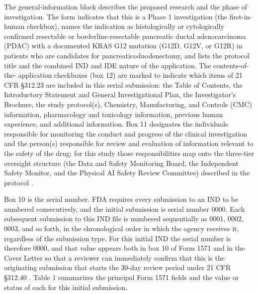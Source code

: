 The general-information block describes the proposed research and the
phase of investigation. The form indicates that this is a Phase 1
investigation (the first-in-human checkbox), names the indication as
histologically or cytologically confirmed resectable or
borderline-resectable pancreatic ductal adenocarcinoma (PDAC) with a
documented KRAS G12 mutation (G12D, G12V, or G12R) in patients who are
candidates for pancreaticoduodenectomy, and lists the protocol title and
the combined IND and IDE nature of the application. The contents-of-the-
application checkboxes (box 12) are marked to indicate which items of 21
CFR \S 312.23 are included in this serial submission: the Table of
Contents, the Introductory Statement and General Investigational Plan, the
Investigator's Brochure, the study protocol(s), Chemistry, Manufacturing,
and Controls (CMC) information, pharmacology and toxicology information,
previous human experience, and additional information. Box 11 designates
the individuals responsible for monitoring the conduct and progress of the
clinical investigation and the person(s) responsible for review and
evaluation of information relevant to the safety of the drug; for this
study those responsibilities map onto the three-tier oversight structure
(the Data and Safety Monitoring Board, the Independent Safety Monitor, and
the Physical AI Safety Review Committee) described in the protocol
\cite{paiautospons, clintrustpai}.

Box 10 is the serial number. FDA requires every submission to an IND
to be numbered consecutively, and the initial submission is serial number
0000. Each subsequent submission to this IND file is numbered
sequentially as 0001, 0002, 0003, and so forth, in the chronological order
in which the agency receives it, regardless of the submission type. For
this initial IND the serial number is therefore 0000, and that value
appears both in box 10 of Form 1571 and in the Cover Letter so that a
reviewer can immediately confirm that this is the originating submission
that starts the 30-day review period under 21 CFR \S 312.40
\cite{phase1guidance, cfr312paiuni}. Table 1 summarizes the principal
Form 1571 fields and the value or status of each for this initial
submission.

